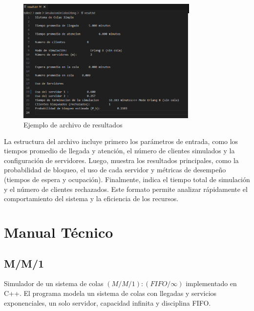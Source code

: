 \documentclass{article}
\begin{document}
\begin{figure}[H]
    \centering
    \includegraphics[width=0.8\textwidth]{images/manualUsuarioErlangBC_5.png}
    \caption{Ejemplo de archivo de resultados}
    \label{fig:resultados}
\end{figure}

La estructura del archivo incluye primero los parámetros de entrada, como los tiempos promedio de llegada y atención, el número de clientes simulados y la configuración de servidores. Luego, muestra los resultados principales, como la probabilidad de bloqueo, el uso de cada servidor y métricas de desempeño (tiempos de espera y ocupación). Finalmente, indica el tiempo total de simulación y el número de clientes rechazados. Este formato permite analizar rápidamente el comportamiento del sistema y la eficiencia de los recursos.


\section{Manual Técnico}

\subsection{M/M/1}\label{subsec:mm1}

Simulador de un sistema de colas $(M/M/1):(FIFO/\infty)$ implementado en C++. El programa modela un sistema de colas con llegadas y servicios exponenciales, un solo servidor, capacidad infinita y disciplina FIFO.
\end{document}
